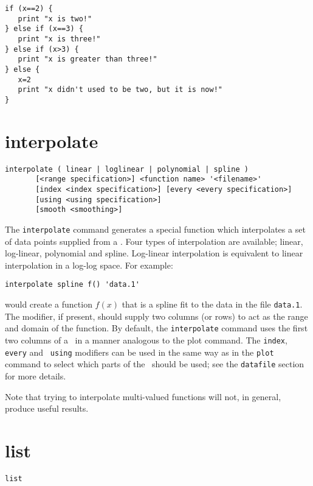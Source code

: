 \begin{verbatim}
if (x==2) {
   print "x is two!"
} else if (x==3) {
   print "x is three!"
} else if (x>3) {
   print "x is greater than three!"
} else {
   x=2
   print "x didn't used to be two, but it is now!"
}
\end{verbatim}

\section{interpolate}

\begin{verbatim}
interpolate ( linear | loglinear | polynomial | spline )
       [<range specification>] <function name> '<filename>' 
       [index <index specification>] [every <every specification>]
       [using <using specification>]
       [smooth <smoothing>]
\end{verbatim}

The {\tt interpolate} command generates a special function which interpolates a
set of data points supplied from a \datafile.  Four types of interpolation are available; linear, log-linear,
polynomial and spline.  Log-linear interpolation is equivalent to linear
interpolation in a log-log space.  For example:

\begin{verbatim}
interpolate spline f() 'data.1'
\end{verbatim}

\noindent would create a function $f(x)$ that is a spline fit to the data in the
file {\tt data.1}. The  modifier, if present, should supply two
columns (or rows) to act as the range and domain of the function.  By default,
the {\tt interpolate} command uses the first two columns of a \datafile\ in a
manner analogous to the plot command. The {\tt index}, {\tt every} and {\tt
using} modifiers can be used in the same way as in the {\tt plot} command to
select which parts of the \datafile\ should be used; see the {\tt datafile}
section for more details.

Note that trying to interpolate multi-valued functions will not, in general,
produce useful results.

\section{list}

\begin{verbatim}
list
\end{verbatim}

